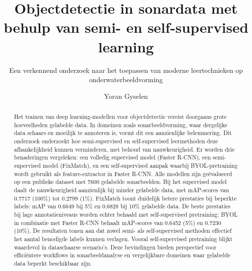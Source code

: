 \documentclass[a0,portrait]{hogent-poster}
\title{Objectdetectie in sonardata met behulp van semi- en self-supervised learning}
\subtitle{Een verkennend onderzoek naar het toepassen van moderne leertechnieken op onderwaterbeeldvorming}
\author{Yoran Gyselen}
\begin{document}
\maketitle

\begin{abstract}
Het trainen van deep learning-modellen voor objectdetectie vereist doorgaans grote hoeveelheden gelabelde data. In domeinen zoals sonarbeeldvorming, waar dergelijke data schaars en moeilijk te annoteren is, vormt dit een aanzienlijke belemmering. Dit onderzoek onderzoekt hoe semi-supervised en self-supervised leermethoden deze afhankelijkheid kunnen verminderen, met behoud van nauwkeurigheid. Er worden drie benaderingen vergeleken: een volledig supervised model (Faster R-CNN), een semi-supervised model (FixMatch), en een self-supervised aanpak waarbij BYOL-pretraining wordt gebruikt als feature-extractor in Faster R-CNN. Alle modellen zijn geëvalueerd op een publieke dataset met 7600 gelabelde sonarbeelden. Bij het supervised model daalt de nauwkeurigheid aanzienlijk bij minder gelabelde data, met mAP-scores van 0.7717 (100\%) tot 0.2799 (1\%). FixMatch toont duidelijk betere prestaties bij beperkte labels: mAP van 0.6649 bij 5\% en 0.6828 bij 10\% gelabelde data. De beste prestaties bij lage annotatieniveaus worden echter behaald met self-supervised pretraining: BYOL in combinatie met Faster R-CNN behaalt mAP-scores van 0.6452 (5\%) en 0.7230 (10\%). De resultaten tonen aan dat zowel semi- als self-supervised methoden effectief het aantal benodigde labels kunnen verlagen. Vooral self-supervised pretraining blijkt waardevol in dataschaarse scenario’s. Deze bevindingen bieden perspectief voor efficiëntere workflows in sonarbeeldanalyse en vergelijkbare domeinen waar gelabelde data beperkt beschikbaar zijn.
\end{abstract}
\end{document}
